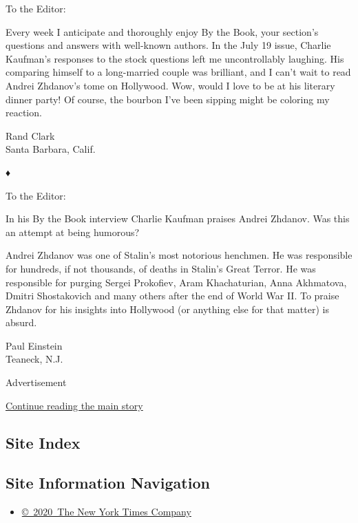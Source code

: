 To the Editor:

Every week I anticipate and thoroughly enjoy By the Book, your section's
questions and answers with well-known authors. In the July 19 issue,
Charlie Kaufman's responses to the stock questions left me
uncontrollably laughing. His comparing himself to a long-married couple
was brilliant, and I can't wait to read Andrei Zhdanov's tome on
Hollywood. Wow, would I love to be at his literary dinner party! Of
course, the bourbon I've been sipping might be coloring my reaction.

Rand Clark\\
Santa Barbara, Calif.

♦

To the Editor:

In his By the Book interview Charlie Kaufman praises Andrei Zhdanov. Was
this an attempt at being humorous?

Andrei Zhdanov was one of Stalin's most notorious henchmen. He was
responsible for hundreds, if not thousands, of deaths in Stalin's Great
Terror. He was responsible for purging Sergei Prokofiev, Aram
Khachaturian, Anna Akhmatova, Dmitri Shostakovich and many others after
the end of World War II. To praise Zhdanov for his insights into
Hollywood (or anything else for that matter) is absurd.

Paul Einstein\\
Teaneck, N.J.

Advertisement

\protect\hyperlink{after-bottom}{Continue reading the main story}

\hypertarget{site-index}{%
\subsection{Site Index}\label{site-index}}

\hypertarget{site-information-navigation}{%
\subsection{Site Information
Navigation}\label{site-information-navigation}}

\begin{itemize}
\tightlist
\item
  \href{https://help.nytimes.com/hc/en-us/articles/115014792127-Copyright-notice}{©~2020~The
  New York Times Company}
\end{itemize}

